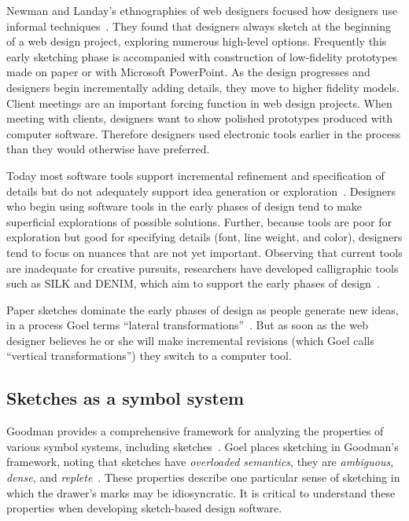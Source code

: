 Newman and Landay's ethnographies of web designers focused how
designers use informal techniques~\cite{newman-web-designers}. They
found that designers always sketch at the beginning of a web design
project, exploring numerous high-level options. Frequently this early
sketching phase is accompanied with construction of low-fidelity
prototypes made on paper or with Microsoft PowerPoint. As the design
progresses and designers begin incrementally adding details, they move
to higher fidelity models. Client meetings are an important forcing
function in web design projects. When meeting with clients, designers
want to show polished prototypes produced with computer
software. Therefore designers used electronic tools earlier in the
process than they would otherwise have preferred.

Today most software tools support incremental refinement and
specification of details but do not adequately support idea generation
or exploration~\cite{terry-creative-ui}. Designers who begin using
software tools in the early phases of design tend to make superficial
explorations of possible solutions. Further, because tools are poor
for exploration but good for specifying details (font, line weight,
and color), designers tend to focus on nuances that are not yet
important. Observing that current tools are inadequate for creative
pursuits, researchers have developed calligraphic tools such as SILK
and DENIM, which aim to support the early phases of
design~\cite{landay-silk,lin-denim}.

Paper sketches dominate the early phases of design as people generate
new ideas, in a process Goel terms ``lateral
transformations''~\cite{goel-sketches-of-thought}. But as soon as the
web designer believes he or she will make incremental revisions (which
Goel calls ``vertical transformations'') they switch to a computer
tool.

\subsection{Sketches as a symbol system}



Goodman provides a comprehensive framework for analyzing the
properties of various symbol systems, including
sketches~\cite{goodman-symbols}. Goel places sketching in Goodman's
framework, noting that sketches have \textit{overloaded semantics},
they are \textit{ambiguous}, \textit{dense}, and
\textit{replete}~\cite{goel-sketches-of-thought}. These properties
describe one particular sense of sketching in which the drawer's marks
may be idiosyncratic. It is critical to understand these properties
when developing sketch-based design software.

